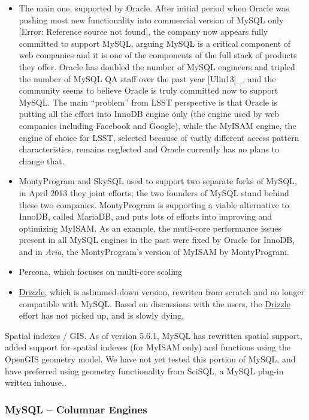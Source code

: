 \documentclass[DM,lsstdraft,toc]{lsstdoc}
\begin{document}
\begin{itemize}
\item
  The main one, supported by Oracle. After initial period when Oracle
  was pushing most new functionality into commercial version of MySQL
  only {[}Error: Reference source not found{]}, the company now appears
  fully committed to support MySQL, arguing MySQL is a critical
  component of web companies and it is one of the components of the full
  stack of products they offer. Oracle has doubled the number of MySQL
  engineers and tripled the number of MySQL QA staff over the past year
  {[}Ulin13{]}\_, and the community seems to believe Oracle is truly
  committed now to support MySQL. The main ``problem'' from LSST
  perspective is that Oracle is putting all the effort into InnoDB
  engine only (the engine used by web companies including Facebook and
  Google), while the MyISAM engine, the engine of choice for LSST,
  selected because of vastly different access pattern characteristics,
  remains neglected and Oracle currently has no plans to change that.
\item
  MontyProgram and SkySQL used to support two separate forks of MySQL,
  in April 2013 they joint efforts; the two founders of MySQL stand
  behind these two companies. MontyProgram is supporting a viable
  alternative to InnoDB, called MariaDB, and puts lots of efforts into
  improving and optimizing MyISAM. As an example, the mutli-core
  performance issues present in all MySQL engines in the past were fixed
  by Oracle for InnoDB, and in \emph{Aria}, the MontyProgram's version
  of MyISAM by MontyProgram.
\item
  Percona, which focuses on multi-core scaling
\item
  \href{http://drizzle.org/}{Drizzle}, which is aslimmed-down version,
  rewriten from scratch and no longer compatible with MySQL. Based on
  discussions with the users, the \href{http://drizzle.org/}{Drizzle}
  effort has not picked up, and is slowly dying.
\end{itemize}

Spatial indexes / GIS. As of version 5.6.1, MySQL has rewritten spatial
support, added support for spatial indexes (for MyISAM only) and
functions using the OpenGIS geometry model. We have not yet tested this
portion of MySQL, and have preferred using geometry functionality from
SciSQL, a MySQL plug-in written inhouse..

\subsubsection{MySQL -- Columnar Engines}\label{mysql-columnar-engines}
\end{document}
